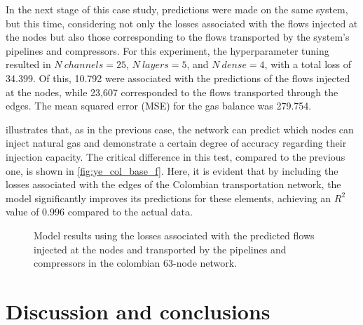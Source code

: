 In the next stage of this case study, predictions were made on the same system, but this time, considering not only the losses associated with the flows injected at the nodes but also those corresponding to the flows transported by the system's pipelines and compressors. For this experiment, the hyperparameter tuning resulted in $N \ channels = 25$, $N \ layers = 5$, and $N \ dense = 4$, with a total loss of 34.399. Of this, 10.792 were associated with the predictions of the flows injected at the nodes, while 23,607 corresponded to the flows transported through the edges. The mean squared error (MSE) for the gas balance was 279.754.

 illustrates that, as in the previous case, the network can predict which nodes can inject natural gas and demonstrate a certain degree of accuracy regarding their injection capacity. The critical difference in this test, compared to the previous one, is shown in \cref{fig:ye_col_base_f}. Here, it is evident that by including the losses associated with the edges of the Colombian transportation network, the model significantly improves its predictions for these elements, achieving an $R^2$ value of 0.996 compared to the actual data.


\begin{figure}
    \centering
        \setlength{}        
        \setlength{} 
        \caption{Model results using the losses associated with the predicted flows injected at the nodes and transported by the pipelines and compressors in the colombian 63-node network.}\label{fig:colombian_base_f_results}
\end{figure}




\section{Discussion and conclusions}
